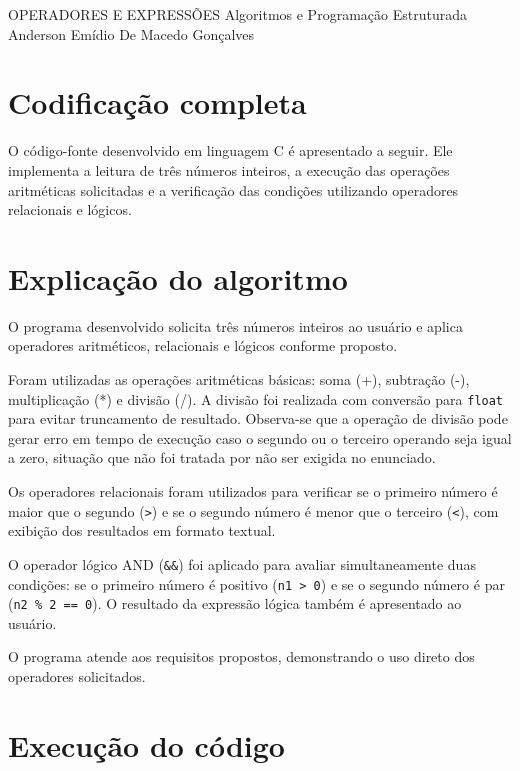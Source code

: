 \documentclass[12pt,a4paper]{article}
\begin{document}
\montarinicio
    {OPERADORES E EXPRESSÕES}
    {Algoritmos e Programação Estruturada}
    {Anderson Emídio De Macedo Gonçalves}

\section{Codificação completa}

O código-fonte desenvolvido em linguagem C é apresentado a seguir. Ele implementa a leitura de três números inteiros, a execução das operações aritméticas solicitadas e a verificação das condições utilizando operadores relacionais e lógicos.

\lstset{language=C}



\newpage

\section{Explicação do algoritmo}

O programa desenvolvido solicita três números inteiros ao usuário e aplica operadores aritméticos, relacionais e lógicos conforme proposto.

Foram utilizadas as operações aritméticas básicas: soma (+), subtração (-), multiplicação (*) e divisão (/). A divisão foi realizada com conversão para \texttt{float} para evitar truncamento de resultado. Observa-se que a operação de divisão pode gerar erro em tempo de execução caso o segundo ou o terceiro operando seja igual a zero, situação que não foi tratada por não ser exigida no enunciado.

Os operadores relacionais foram utilizados para verificar se o primeiro número é maior que o segundo (\texttt{>}) e se o segundo número é menor que o terceiro (\texttt{<}), com exibição dos resultados em formato textual.

O operador lógico AND (\texttt{\&\&}) foi aplicado para avaliar simultaneamente duas condições: se o primeiro número é positivo (\texttt{n1 > 0}) e se o segundo número é par (\texttt{n2 \% 2 == 0}). O resultado da expressão lógica também é apresentado ao usuário.

O programa atende aos requisitos propostos, demonstrando o uso direto dos operadores solicitados.

\newpage

\section{Execução do código}
\end{document}
